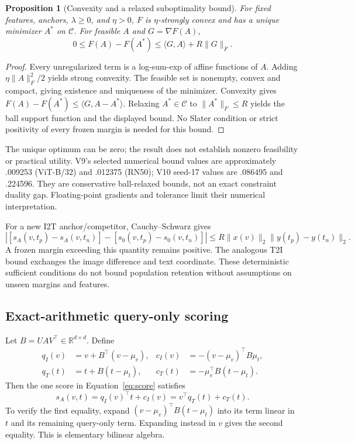 \documentclass[11pt]{article}
\newtheorem{proposition}{Proposition}
\newcommand{\ip}[2]{\langle #1,#2\rangle}
\newcommand{\norm}[1]{\lVert #1\rVert}
\newcommand{\R}{\mathbb R}
\begin{document}
\begin{proposition}[Convexity and a relaxed suboptimality bound]
For fixed features, anchors, $\lambda\ge0$, and $\eta>0$, $F$ is
$\eta$-strongly convex and has a unique minimizer $A^*$ on $\mathcal C$.
For feasible $A$ and $G=\nabla F(A)$,
\begin{equation}
 0\le F(A)-F(A^*)\le\ip{G}{A}+R\norm{G}_F.
\end{equation}
\end{proposition}
\begin{proof}
Every unregularized term is a log-sum-exp of affine functions of $A$.
Adding $\eta\norm{A}_F^2/2$ yields strong convexity. The feasible set is
nonempty, convex and compact, giving existence and uniqueness of the
minimizer. Convexity gives
$F(A)-F(A^*)\le\ip{G}{A-A^*}$. Relaxing $A^*\in\mathcal C$ to
$\norm{A^*}_F\le R$ yields the ball support function and the displayed
bound. No Slater condition or strict positivity of every frozen margin is
needed for this bound.
\end{proof}
The unique optimum can be zero; the result does not establish nonzero
feasibility or practical utility. V9's selected numerical bound values are
approximately .009253 (ViT-B/32) and .012375 (RN50); V10 seed-17 values are
.086495 and .224596. They are conservative
ball-relaxed bounds, not an exact constraint duality gap. Floating-point
gradients and tolerance limit their numerical interpretation.

For a new I2T anchor/competitor, Cauchy--Schwarz gives
\begin{equation}
 |[s_A(v,t_p)-s_A(v,t_n)]-[s_0(v,t_p)-s_0(v,t_n)]|
 \le R\norm{x(v)}_2\norm{y(t_p)-y(t_n)}_2.
\end{equation}
A frozen margin exceeding this quantity remains positive. The analogous
T2I bound exchanges the image difference and text coordinate. These
deterministic sufficient conditions do not bound population retention
without assumptions on unseen margins and features.

\subsection{Exact-arithmetic query-only scoring}\label{app:query}
Let $B=UAV^\top\in\R^{d\times d}$. Define
\begin{align}
 q_I(v)&=v+B^\top(v-\mu_v),
 &c_I(v)&=-(v-\mu_v)^\top B\mu_t,\\
 q_T(t)&=t+B(t-\mu_t),
 &c_T(t)&=-\mu_v^\top B(t-\mu_t).
\end{align}
Then the one score in Equation~\eqref{eq:score} satisfies
\begin{equation}
 s_A(v,t)=q_I(v)^\top t+c_I(v)
         =v^\top q_T(t)+c_T(t).
 \label{eq:query-scoring}
\end{equation}
To verify the first equality, expand
$(v-\mu_v)^\top B(t-\mu_t)$ into its term linear in $t$ and its
remaining query-only term. Expanding instead in $v$ gives the second
equality. This is elementary bilinear algebra.
\end{document}
